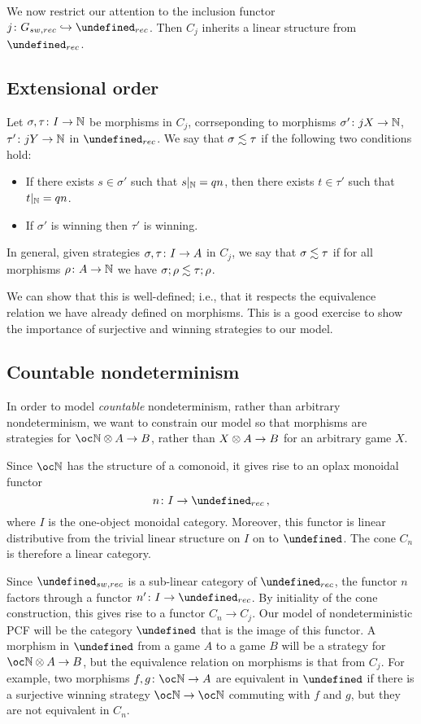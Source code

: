 \documentclass[sigplan,10pt,review]{acmart}\settopmatter{printfolios=true,printccs=false,printacmref=false}
\let\G\undefined
\let\C\undefined
\begin{document}
We now restrict our attention to the inclusion functor $j\from G_{sw,rec}\hookrightarrow \G_{rec}$.  
Then $C_j$ inherits a linear structure from $\G_{rec}$.  

\subsection{Extensional order}

Let $\sigma,\tau\colon I \to \mathbb{N}$ be morphisms in $C_j$, corrseponding to morphisms $\sigma'\colon jX \to \mathbb{N}$, $\tau'\colon jY \to \mathbb{N}$ in $\G_{rec}$.  
We say that $\sigma\lesssim\tau$ if the following two conditions hold:
\begin{itemize}
  \item If there exists $s\in \sigma'$ such that $s\vert_{\mathbb{N}}=qn$, then there exists $t\in\tau'$ such that $t\vert_{\mathbb{N}}=qn$.
  \item If $\sigma'$ is winning then $\tau'$ is winning.
\end{itemize}
In general, given strategies $\sigma,\tau\colon I \to A$ in $C_j$, we say that $\sigma\lesssim\tau$ if for all morphisms $\rho\colon A \to \mathbb{N}$ we have $\sigma;\rho\lesssim\tau;\rho$.

We can show that this is well-defined; i.e., that it respects the equivalence relation we have already defined on morphisms.  
This is a good exercise to show the importance of surjective and winning strategies to our model.

\subsection{Countable nondeterminism}

In order to model \emph{countable} nondeterminism, rather than arbitrary nondeterminism, we want to constrain our model so that morphisms are strategies for $\oc\bN\tensor A \to B$, rather than $X \otimes A \to B$ for an arbitrary game $X$.  

Since $\oc\bN$ has the structure of a comonoid, it gives rise to an oplax monoidal functor
\[
  n\from I \to \G_{rec}\,,
  \]
where $I$ is the one-object monoidal category.  
Moreover, this functor is linear distributive from the trivial linear structure on $I$ on to $\G$.
The cone $C_n$ is therefore a linear category.  

Since $\G_{sw,rec}$ is a sub-linear category of $\G_{rec}$, the functor $n$ factors through a functor $n'\from I \to \G_{rec}$.  
By initiality of the cone construction, this gives rise to a functor $C_n\to C_j$.  
Our model of nondeterministic PCF will be the category $\C$ that is the image of this functor.
A morphism in $\C$ from a game $A$ to a game $B$ will be a strategy for $\oc \bN \tensor A \to B$, but the equivalence relation on morphisms is that from $C_j$.  
For example, two morphisms $f,g\from \oc\bN\to A$ are equivalent in $\C$ if there is a surjective winning strategy $\oc\bN\to \oc\bN$ commuting with $f$ and $g$, but they are not equivalent in $C_n$.  
\end{document}
